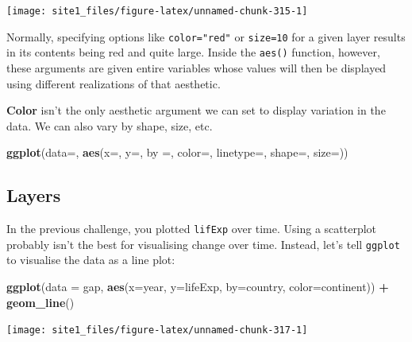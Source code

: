 \documentclass[]{book}
\newenvironment{Shaded}{\begin{snugshade}}{\end{snugshade}}
\newcommand{\KeywordTok}[1]{\textcolor[rgb]{0.13,0.29,0.53}{\textbf{#1}}}
\newcommand{\DataTypeTok}[1]{\textcolor[rgb]{0.13,0.29,0.53}{#1}}
\newcommand{\StringTok}[1]{\textcolor[rgb]{0.31,0.60,0.02}{#1}}
\newcommand{\OperatorTok}[1]{\textcolor[rgb]{0.81,0.36,0.00}{\textbf{#1}}}
\newcommand{\NormalTok}[1]{#1}
\begin{document}
\begin{center}\texttt{[image: site1\_files/figure-latex/unnamed-chunk-315-1]} \end{center}

Normally, specifying options like \texttt{color="red"} or
\texttt{size=10} for a given layer results in its contents being red and
quite large. Inside the \texttt{aes()} function, however, these
arguments are given entire variables whose values will then be displayed
using different realizations of that aesthetic.

\textbf{Color} isn't the only aesthetic argument we can set to display
variation in the data. We can also vary by shape, size, etc.

\begin{Shaded}
\begin{Highlighting}[]
\KeywordTok{ggplot}\NormalTok{(}\DataTypeTok{data=}\NormalTok{, }\KeywordTok{aes}\NormalTok{(}\DataTypeTok{x=}\NormalTok{, }\DataTypeTok{y=}\NormalTok{, }\DataTypeTok{by =}\NormalTok{, }\DataTypeTok{color=}\NormalTok{, }\DataTypeTok{linetype=}\NormalTok{, }\DataTypeTok{shape=}\NormalTok{, }\DataTypeTok{size=}\NormalTok{))}
\end{Highlighting}
\end{Shaded}

\subsection{Layers}\label{layers}

In the previous challenge, you plotted \texttt{lifExp} over time. Using
a scatterplot probably isn't the best for visualising change over time.
Instead, let's tell \texttt{ggplot} to visualise the data as a line
plot:

\begin{Shaded}
\begin{Highlighting}[]
\KeywordTok{ggplot}\NormalTok{(}\DataTypeTok{data =}\NormalTok{ gap, }\KeywordTok{aes}\NormalTok{(}\DataTypeTok{x=}\NormalTok{year, }\DataTypeTok{y=}\NormalTok{lifeExp, }\DataTypeTok{by=}\NormalTok{country, }\DataTypeTok{color=}\NormalTok{continent)) }\OperatorTok{+}\StringTok{ }
\StringTok{  }\KeywordTok{geom_line}\NormalTok{()}
\end{Highlighting}
\end{Shaded}

\begin{center}\texttt{[image: site1\_files/figure-latex/unnamed-chunk-317-1]} \end{center}
\end{document}
